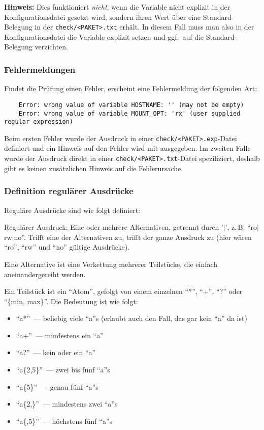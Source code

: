 \textbf{Hinweis:} Dies funktioniert \emph{nicht}, wenn die Variable nicht
explizit in der Konfigurationsdatei gesetzt wird, sondern ihren Wert
über eine Standard-Belegung in der \texttt{check/<PAKET>.txt} erhält. In
diesem Fall muss man also in der Konfigurationsdatei die Variable explizit
setzen und ggf.\ auf die Standard-Belegung verzichten.

\subsubsection{Fehlermeldungen}

Findet die Prüfung einen Fehler, erscheint eine Fehlermeldung der
folgenden Art:

\begin{example}
\begin{verbatim}
    Error: wrong value of variable HOSTNAME: '' (may not be empty)
    Error: wrong value of variable MOUNT_OPT: 'rx' (user supplied regular expression)
\end{verbatim}
\end{example}

Beim ersten Fehler wurde der Ausdruck in einer \texttt{check/<PAKET>.exp}-Datei definiert und
ein Hinweis auf den Fehler wird mit ausgegeben. Im zweiten Falle wurde
der Ausdruck direkt in einer \texttt{check/<PAKET>.txt}-Datei spezifiziert, deshalb gibt es keinen
zusätzlichen Hinweis auf die Fehlerursache.


\subsubsection{Definition regulärer Ausdrücke}

Reguläre Ausdrücke sind wie folgt definiert:

Regulärer Ausdruck: Eine oder mehrere Alternativen, getrennt durch
'$|$', z.\,B. "`ro$|$rw$|$no"'. Trifft eine der Alternativen zu, trifft der
ganze Ausdruck zu (hier wären "`ro"', "`rw"' und "`no"' gültige Ausdrücke).

Eine Alternative ist eine Verkettung mehrerer Teilstücke, die einfach
aneinandergereiht werden.

Ein Teilstück ist ein "`Atom"', gefolgt von einem einzelnen "`*"', "`+"',
"`?"' oder "`\{min, max\}"'. Die Bedeutung ist wie folgt:
\begin{itemize}
\item "`a*"'~--- beliebig viele "`a"'s (erlaubt auch den Fall, das gar kein "`a"' da ist)
\item   "`a+"'~--- mindestens ein "`a"'
\item   "`a?"'~--- kein oder ein "`a"'
\item   "`a\{2,5\}"'~--- zwei bis fünf "`a"'s
\item   "`a\{5\}"'~--- genau fünf "`a"'s
\item   "`a\{2,\}"'~--- mindestens zwei "`a"'s
\item   "`a\{,5\}"'~--- höchstens fünf "`a"'s
\end{itemize}

